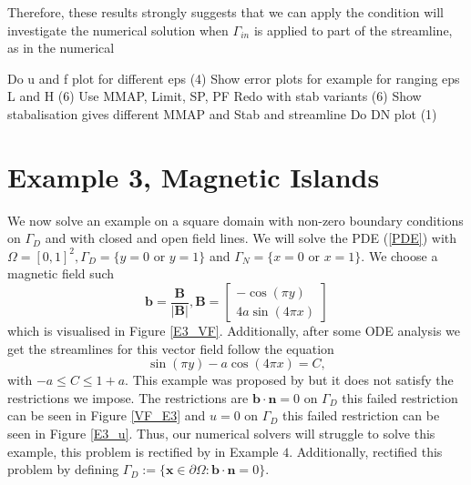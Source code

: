 \documentclass[12pt]{ociamthesis}
\begin{document}
Therefore, these results strongly suggests that we can apply the condition  will investigate the numerical solution when $\Gamma_{in}$ is applied to part of the streamline, as in the numerical

Do u and f plot for different eps (4)
Show error plots for example for ranging eps  L and H (6)
Use MMAP, Limit, SP, PF
Redo with stab variants (6)
Show stabalisation gives different MMAP and Stab and streamline
Do DN plot (1)

\section{Example 3, Magnetic Islands}
We now solve an example on a square domain with non-zero boundary conditions on $\Gamma_D$ and with closed and open field lines. We will solve the PDE (\ref{PDE}) with $\Omega = [0,1]^2, \Gamma_D = \{y=0 \text{ or } y=1\}$ and $\Gamma_N = \{x=0 \text{ or } x=1\}$. We choose a magnetic field such 
\begin{equation}
\mathbf{b} = \frac{\mathbf{B}}{|\mathbf{B}|}, 
\mathbf{B} = \left[ \begin{matrix}
-\cos(\pi y)\\
4a \sin(4 \pi x)
\end{matrix} \right]
\end{equation}
which is visualised in Figure \ref{E3_VF}. Additionally, after some ODE analysis we get the streamlines for this vector field follow the equation
\begin{equation}
\sin(\pi y)-a\cos(4\pi x) = C,
\end{equation}
with $-a\leq C \leq 1+a$. This example was proposed by \cite{DN} but it does not satisfy the restrictions we impose. The restrictions are $\mathbf{b} \cdot \mathbf{n} = 0$ on $\Gamma_D$ this failed restriction can be seen in Figure \ref{VF_E3} and $u = 0$ on $\Gamma_D$ this failed restriction can be seen in Figure \ref{E3_u}. Thus, our numerical solvers will struggle to solve this example, this problem is rectified by in Example $4$. Additionally, \cite{DN} rectified this problem by defining $\Gamma_D := \{\mathbf{x} \in \partial \Omega :  \mathbf{b} \cdot \mathbf{n} = 0\}$.
\end{document}
